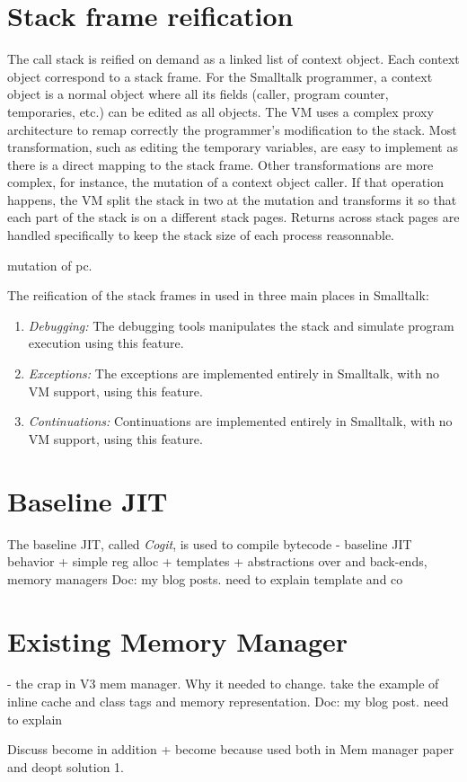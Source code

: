 \documentclass[a4paper,12pt,twoside]{../includes/ThesisStyle}
\begin{document}
\section{Stack frame reification}


The call stack is reified on demand as a linked list of context object. Each context object correspond to a stack frame. For the Smalltalk programmer, a context object is a normal object where all its fields (caller, program counter, temporaries, etc.) can be edited as all objects. The VM uses a complex proxy architecture to remap correctly the programmer's modification to the stack. Most transformation, such as editing the temporary variables, are easy to implement as there is a direct mapping to the stack frame. Other transformations are more complex, for instance, the mutation of a context object caller. If that operation happens, the VM split the stack in two at the mutation and transforms it so that each part of the stack is on a different stack pages. Returns across stack pages are handled specifically to keep the stack size of each process reasonnable.

mutation of pc.

The reification of the stack frames in used in three main places in Smalltalk:
\begin{enumerate}
	\item \emph{Debugging: } The debugging tools manipulates the stack and simulate program execution using this feature.
	\item \emph{Exceptions: } The exceptions are implemented entirely in Smalltalk, with no VM support, using this feature.
	\item \emph{Continuations: } Continuations are implemented entirely in Smalltalk, with no VM support, using this feature.
\end{enumerate}

\section{Baseline JIT}

The baseline JIT, called \emph{Cogit}, is used to compile bytecode
- baseline JIT behavior + simple reg alloc + templates + abstractions over and back-ends, memory managers
Doc: my blog posts. need to explain template and co

\section{Existing Memory Manager}
- the crap in V3 mem manager. Why it needed to change.
take the example of inline cache and class tags and memory representation.
Doc: my blog post. need to explain


Discuss become in addition
+ become because used both in Mem manager paper and deopt solution 1.

\ifx\wholebook\relax\else
    
\end{document}
